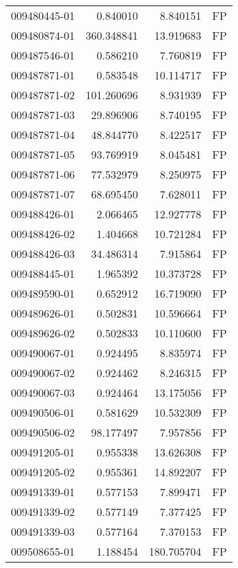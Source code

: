 \begin{tabular}{lrrl}
009480445-01 &    0.840010 &       8.840151 &   FP \\
009480874-01 &  360.348841 &      13.919683 &   FP \\
009487546-01 &    0.586210 &       7.760819 &   FP \\
009487871-01 &    0.583548 &      10.114717 &   FP \\
009487871-02 &  101.260696 &       8.931939 &   FP \\
009487871-03 &   29.896906 &       8.740195 &   FP \\
009487871-04 &   48.844770 &       8.422517 &   FP \\
009487871-05 &   93.769919 &       8.045481 &   FP \\
009487871-06 &   77.532979 &       8.250975 &   FP \\
009487871-07 &   68.695450 &       7.628011 &   FP \\
009488426-01 &    2.066465 &      12.927778 &   FP \\
009488426-02 &    1.404668 &      10.721284 &   FP \\
009488426-03 &   34.486314 &       7.915864 &   FP \\
009488445-01 &    1.965392 &      10.373728 &   FP \\
009489590-01 &    0.652912 &      16.719090 &   FP \\
009489626-01 &    0.502831 &      10.596664 &   FP \\
009489626-02 &    0.502833 &      10.110600 &   FP \\
009490067-01 &    0.924495 &       8.835974 &   FP \\
009490067-02 &    0.924462 &       8.246315 &   FP \\
009490067-03 &    0.924464 &      13.175056 &   FP \\
009490506-01 &    0.581629 &      10.532309 &   FP \\
009490506-02 &   98.177497 &       7.957856 &   FP \\
009491205-01 &    0.955338 &      13.626308 &   FP \\
009491205-02 &    0.955361 &      14.892207 &   FP \\
009491339-01 &    0.577153 &       7.899471 &   FP \\
009491339-02 &    0.577149 &       7.377425 &   FP \\
009491339-03 &    0.577164 &       7.370153 &   FP \\
009508655-01 &    1.188454 &     180.705704 &   FP \\

\end{tabular}
